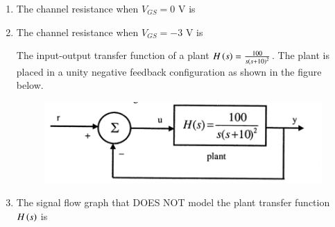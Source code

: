 \documentclass[a4paper, 11pt]{article}
\begin{document}
\begin{enumerate}
    \item The channel resistance when $V_{GS}=0$ V is
    \begin{enumerate}
    \end{enumerate}
    
    \hfill{}

    \item The channel resistance when $V_{GS}=-3$ V is
    \begin{enumerate}
    \end{enumerate}
    
    \hfill{}

    The input-output transfer function of a plant $H\left(s\right)=\frac{100}{s\left(s+10\right)^{2}}$. The plant is placed in a unity negative feedback configuration as shown in the figure below.
    
    \begin{figure}[H]
        \centering
        \includegraphics[width=0.8\columnwidth]{figs/q50_51.png}
        \caption*{}
        \label{fig:q50_51}
    \end{figure}

    \item The signal flow graph that DOES NOT model the plant transfer function $H\left(s\right)$ is
    

\end{enumerate}
\end{document}
